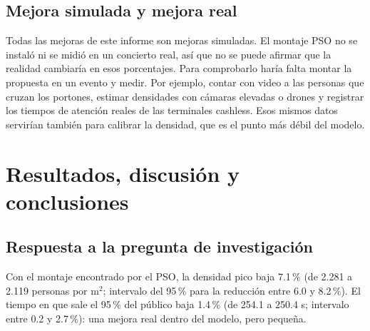 \documentclass[11pt,letterpaper]{article}
\begin{document}
\begin{table}[H]
\centering
\caption{Densidad pico del modelo y valor ajustado con el factor observado en Jülich (30 réplicas por condición).}
\label{tab:dens_ajustada}
\resizebox{\textwidth}{!}{}
\end{table}

\subsection{Mejora simulada y mejora real}
Todas las mejoras de este informe son mejoras simuladas. El montaje PSO no se instaló ni se midió en un concierto real, así que no se puede afirmar que la realidad cambiaría en esos porcentajes. Para comprobarlo haría falta montar la propuesta en un evento y medir. Por ejemplo, contar con video a las personas que cruzan los portones, estimar densidades con cámaras elevadas o drones y registrar los tiempos de atención reales de las terminales cashless. Esos mismos datos servirían también para calibrar la densidad, que es el punto más débil del modelo.

\section{Resultados, discusión y conclusiones}

\subsection{Respuesta a la pregunta de investigación}
Con el montaje encontrado por el PSO, la densidad pico baja 7.1\,\% (de 2.281 a 2.119 personas por m$^2$; intervalo del 95\,\% para la reducción entre 6.0 y 8.2\,\%). El tiempo en que sale el 95\,\% del público baja 1.4\,\% (de 254.1 a 250.4 s; intervalo entre 0.2 y 2.7\,\%): una mejora real dentro del modelo, pero pequeña.
\end{document}
